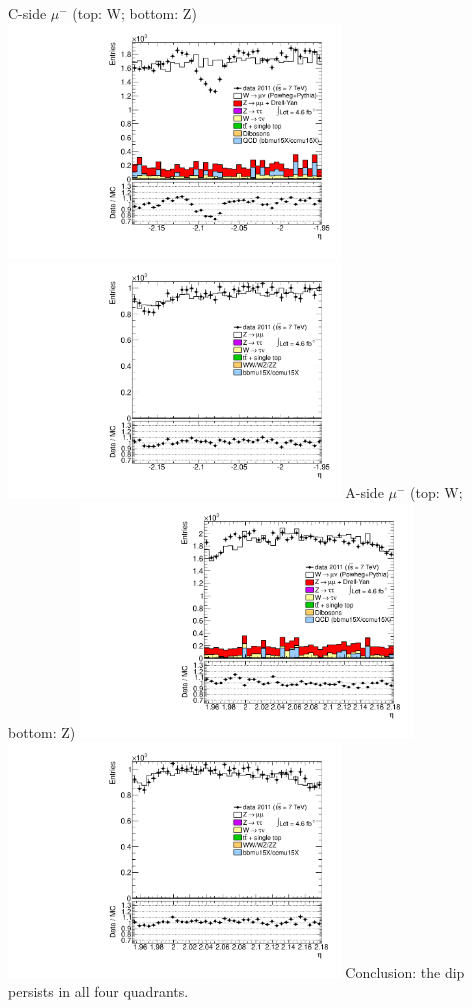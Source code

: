  {
\colb[T]
C-side $\mu^{-}$ (top: W; bottom: Z)
\centering
\includegraphics[width=0.66\textwidth]{dates/20130306/figures/both/WlQ4_10_C_stack_l_eta_NEG} \\
\includegraphics[width=0.66\textwidth]{dates/20130306/figures/both/Z_10_C_stack_lN_eta_ALL.pdf}
A-side $\mu^{-}$ (top: W; bottom: Z)
\centering
\includegraphics[width=0.66\textwidth]{dates/20130306/figures/both/WlQ4_10_A_stack_l_eta_NEG} \\
\includegraphics[width=0.66\textwidth]{dates/20130306/figures/both/Z_10_A_stack_lN_eta_ALL.pdf} 
\cole
}
 {
Conclusion: the dip persists in all four quadrants.
}

